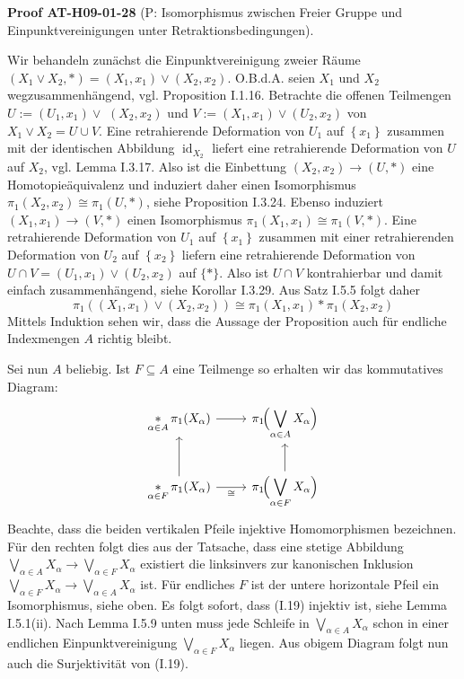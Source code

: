 \documentclass[10pt, letterpaper]{article}
\newcommand{\CustomHeading}[3]{%
  \par\medskip\noindent%
  \textbf{#1 #2} \textnormal{(#3)}.\enskip%
}
\newenvironment{PROOF}[2]{\begin{unitbox}\CustomHeading{Proof}{#1}{#2}}{\end{unitbox}}
\begin{document}
\begin{PROOF}{AT-H09-01-28}{P: Isomorphismus zwischen Freier Gruppe und Einpunktvereinigungen unter Retraktionsbedingungen}
Wir behandeln zunächst die Einpunktvereinigung zweier Räume $\left(X_1 \vee X_2, *\right)=\left(X_1, x_1\right) \vee\left(X_2, x_2\right)$. O.B.d.A. seien $X_1$ und $X_2$ wegzusammenhängend, vgl. Proposition I.1.16. Betrachte die offenen Teilmengen $U:=\left(U_1, x_1\right) \vee$ $\left(X_2, x_2\right)$ und $V:=\left(X_1, x_1\right) \vee\left(U_2, x_2\right)$ von $X_1 \vee X_2=U \cup V$. Eine retrahierende Deformation von $U_1$ auf $\left\{x_1\right\}$ zusammen mit der identischen Abbildung $\operatorname{id}_{X_2}$ liefert eine retrahierende Deformation von $U$ auf $X_2$, vgl. Lemma I.3.17. Also ist die Einbettung $\left(X_2, x_2\right) \rightarrow(U, *)$ eine Homotopieäquivalenz und induziert daher einen Isomorphismus $\pi_1\left(X_2, x_2\right) \cong \pi_1(U, *)$, siehe Proposition I.3.24. Ebenso induziert $\left(X_1, x_1\right) \rightarrow(V, *)$ einen Isomorphismus $\pi_1\left(X_1, x_1\right) \cong \pi_1(V, *)$. Eine retrahierende Deformation von $U_1$ auf $\left\{x_1\right\}$ zusammen mit einer retrahierenden Deformation von $U_2$ auf $\left\{x_2\right\}$ liefern eine retrahierende Deformation von $U \cap V=\left(U_1, x_1\right) \vee\left(U_2, x_2\right)$ auf $\{*\}$. Also ist $U \cap V$ kontrahierbar und damit einfach zusammenhängend, siehe Korollar I.3.29. Aus Satz I.5.5 folgt daher
$$
\pi_1\left(\left(X_1, x_1\right) \vee\left(X_2, x_2\right)\right) \cong \pi_1\left(X_1, x_1\right) * \pi_1\left(X_2, x_2\right)
$$
Mittels Induktion sehen wir, dass die Aussage der Proposition auch für endliche Indexmengen $A$ richtig bleibt.

Sei nun $A$ beliebig. Ist $F \subseteq A$ eine Teilmenge so erhalten wir das kommutatives Diagram:
\[
\begin{tikzcd}
  \displaystyle\mathop{\ast}_{\alpha\in A} \pi_{1}(X_{\alpha})
    \arrow[r]
  & \displaystyle \pi_{1}\!\Bigl(\bigvee_{\alpha\in A} X_{\alpha}\Bigr) \\[1ex]
  \displaystyle\mathop{\ast}_{\alpha\in F} \pi_{1}(X_{\alpha})
    \arrow[u]
    \arrow[r, "\cong"']
  & \displaystyle \pi_{1}\!\Bigl(\bigvee_{\alpha\in F} X_{\alpha}\Bigr)
    \arrow[u]
\end{tikzcd}
\]
Beachte, dass die beiden vertikalen Pfeile injektive Homomorphismen bezeichnen. Für den rechten folgt dies aus der Tatsache, dass eine stetige Abbildung $\bigvee_{\alpha \in A} X_\alpha \rightarrow \bigvee_{\alpha \in F} X_\alpha$ existiert die linksinvers zur kanonischen Inklusion $\bigvee_{\alpha \in F} X_\alpha \rightarrow \bigvee_{\alpha \in A} X_\alpha$ ist. Für endliches $F$ ist der untere horizontale Pfeil ein Isomorphismus, siehe oben. Es folgt sofort, dass (I.19) injektiv ist, siehe Lemma I.5.1(ii). Nach Lemma I.5.9 unten muss jede Schleife in $\bigvee_{\alpha \in A} X_\alpha$ schon in einer endlichen Einpunktvereinigung $\bigvee_{\alpha \in F} X_\alpha$ liegen. Aus obigem Diagram folgt nun auch die Surjektivität von (I.19).
\end{PROOF}
\end{document}
